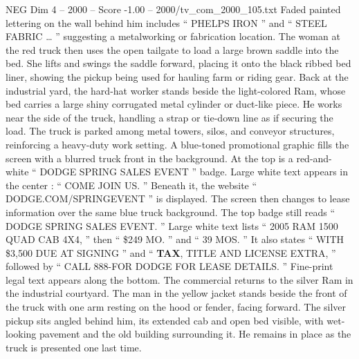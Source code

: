 \begin{textsample}{NEG Dim 4 – 2000 – Score -1.00 – 2000/tv\_com\_2000\_105.txt}
Faded painted lettering on the wall behind him includes “ PHELPS IRON ” and “ STEEL FABRIC … ” suggesting a metalworking or fabrication location.
The woman at the red truck then uses the open tailgate to load a large brown saddle into the bed.
She lifts and swings the saddle forward, placing it onto the black ribbed bed liner, showing the pickup being used for hauling farm or riding gear.
Back at the industrial yard, the hard-hat worker stands beside the light-colored Ram, whose bed carries a large shiny corrugated metal cylinder or duct-like piece.
He works near the side of the truck, handling a strap or tie-down line as if securing the load.
The truck is parked among metal towers, silos, and conveyor structures, reinforcing a heavy-duty work setting.
A blue-toned promotional graphic fills the screen with a blurred truck front in the background.
At the top is a red-and-white “ DODGE SPRING SALES EVENT ” badge.
Large white text appears in the center : “ COME JOIN US. ” Beneath it, the website “ DODGE.COM/SPRINGEVENT ” is displayed.
The screen then changes to lease information over the same blue truck background.
The top badge still reads “ DODGE SPRING SALES EVENT. ” Large white text lists “ 2005 RAM 1500 QUAD CAB 4X4, ” then “ \$249 MO. ” and “ 39 MOS. ” It also states “ WITH \$3,500 DUE AT SIGNING ” and “ \textbf{TAX}, TITLE AND LICENSE EXTRA, ” followed by “ CALL 888-FOR DODGE FOR LEASE DETAILS. ” Fine-print legal text appears along the bottom.
The commercial returns to the silver Ram in the industrial courtyard.
The man in the yellow jacket stands beside the front of the truck with one arm resting on the hood or fender, facing forward.
The silver pickup sits angled behind him, its extended cab and open bed visible, with wet-looking pavement and the old building surrounding it.
He remains in place as the truck is presented one last time.

\end{textsample}
